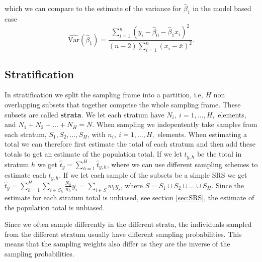 \documentclass{article}
\begin{document}
which we can compare to the estimate of the variance for \(\hat{\beta}_1\) in
the model based case
\begin{equation*}
 \widehat{\mathrm{Var}} \left( \hat{\beta}_1 \right) = \frac{\sum_{i = 1}^n\left( y_i - \hat{\beta}_0 -
 \hat{\beta}_1 x_i \right)^2}{
   \left( n - 2 \right)\sum_{i = 1}^n \left( x_i - \bar{x} \right)^2}.
\end{equation*}


\subsection{Stratification} \label{sec:strat}

In stratification we split the sampling frame into a partition, i.e, \(H\) non
overlapping subsets that together comprise the whole sampling frame. These
subsets are called \textbf{strata}. We let each stratum have \(N_i,\ i = 1, \dots
, H,\) elements, and \(N_1 + N_2 + \dots + N_H = N\). When sampling we
indepentently take samples from each stratum, \(S_1, S_2, \dots, S_H\), with \(n_i,\ i = 1, \dots
, H,\) elements. When
estimating a total we can therefore first estimate the total of each stratum and
then add these totals to get an estimate of the population total.
If we let \(t_{y,h}\) be the total in stratum \(h\) we get \(\hat{t}_y =
\sum_{h = 1}^H \hat{t}_{y, h} \), where we can use different sampling schemes to
estimate each \(t_{y, h}\).
If we let each sample of the subsets be a simple SRS we get \( \hat{t}_y =
\sum_{h = 1}^H\sum_{i \in S_h}\frac{N_h}{n_h}y_i = \sum_{i \in S} w_i y_i\),
where \(S = S_1 \cup S_2 \cup \dots \cup S_H\).
Since the estimate for each
stratum total is unbiased, see section \ref{sec:SRS}, the estimate of the population
total is unbiased.


Since we often sample differently in the different strata,
the individuals sampled from the different stratum usually have
different sampling probabilities. This means that the sampling weights also
differ as they are the inverse of the sampling probabilities.
\end{document}
